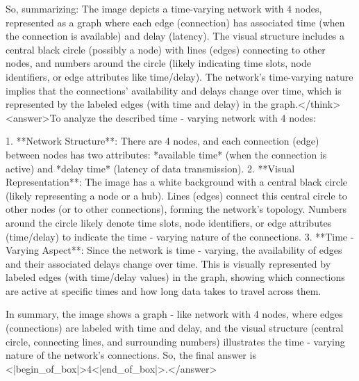 So, summarizing: The image depicts a time-varying network with 4 nodes, represented as a graph where each edge (connection) has associated time (when the connection is available) and delay (latency). The visual structure includes a central black circle (possibly a node) with lines (edges) connecting to other nodes, and numbers around the circle (likely indicating time slots, node identifiers, or edge attributes like time/delay). The network's time-varying nature implies that the connections' availability and delays change over time, which is represented by the labeled edges (with time and delay) in the graph.</think><answer>To analyze the described time - varying network with 4 nodes:  

1. **Network Structure**: There are 4 nodes, and each connection (edge) between nodes has two attributes: *available time* (when the connection is active) and *delay time* (latency of data transmission).  
2. **Visual Representation**: The image has a white background with a central black circle (likely representing a node or a hub). Lines (edges) connect this central circle to other nodes (or to other connections), forming the network’s topology. Numbers around the circle likely denote time slots, node identifiers, or edge attributes (time/delay) to indicate the time - varying nature of the connections.  
3. **Time - Varying Aspect**: Since the network is time - varying, the availability of edges and their associated delays change over time. This is visually represented by labeled edges (with time/delay values) in the graph, showing which connections are active at specific times and how long data takes to travel across them.  


In summary, the image shows a graph - like network with 4 nodes, where edges (connections) are labeled with time and delay, and the visual structure (central circle, connecting lines, and surrounding numbers) illustrates the time - varying nature of the network’s connections.  
So, the final answer is <|begin_of_box|>4<|end_of_box|>.</answer>